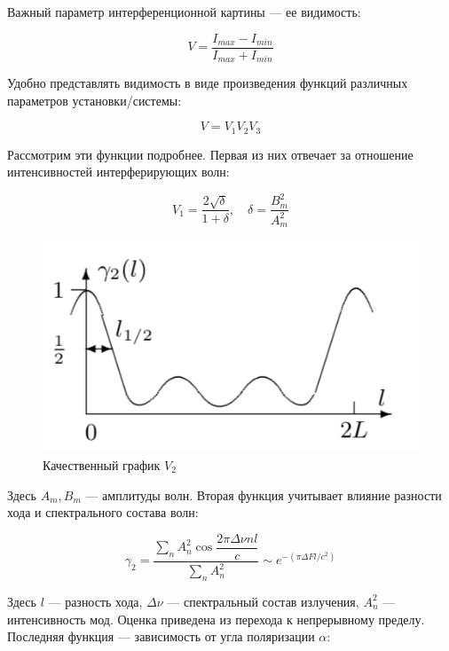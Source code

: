 \documentclass[12pt]{kiarticle}
\begin{document}
	Важный параметр интерференционной картины --- ее видимость:
	
	\begin{equation}\label{V0}
	V = \dfrac{I_{max} - I_{min}}{I_{max} + I_{min}}
	\end{equation}
	
	Удобно представлять видимость в виде произведения функций различных параметров установки/системы:
	
	\begin{equation}\label{VVV}
	V = V_1 V_2 V_3
	\end{equation}
	
	Рассмотрим эти функции подробнее. Первая из них отвечает за отношение интенсивностей интерферирующих волн:
	
	\begin{equation}\label{V1}
	V_1 = \dfrac{2\sqrt{\delta}}{1 + \delta}, \quad \delta = \dfrac{B_m^2}{A_m^2}
	\end{equation}
	
	\begin{figure} 
		\includegraphics[width=\linewidth]{v2}
		\caption{Качественный график $ V_2 $}
		\label{V2graf}
	\end{figure}
	
	
	Здесь $ A_m, B_m $ --- амплитуды волн. Вторая функция учитывает влияние разности хода и спектрального состава волн:
	
	\begin{equation}\label{}
	\gamma_2 = \dfrac{\sum\limits_n A_n^2 \cos{\dfrac{2\pi \Delta \nu n l}{c}}}{\sum\limits_n A_n^2} \sim e^{-(\pi \Delta F l /c^2)}
	\end{equation}
	
	
	Здесь $ l $ --- разность хода, $ \Delta\nu $ --- спектральный состав излучения, $ A_n^2 $ --- интенсивность мод. Оценка приведена из перехода к непрерывному пределу. Последняя функция --- зависимость от угла поляризации $ \alpha $:
	
\end{document}
